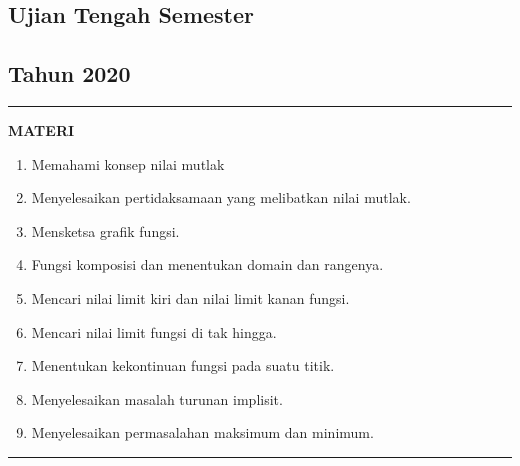 \begin{flushright}
    \section*{\Large{Ujian Tengah Semester}}
    \subsection*{Tahun 2020}
\end{flushright}


\vspace{0.5cm}\hrule height 2pt\vspace{0.5cm}


\begin{center}
\textbf{\large{MATERI}}
\begin{enumerate}[leftmargin=*, label={\arabic*}.]
\item Memahami konsep nilai mutlak
\item Menyelesaikan pertidaksamaan yang melibatkan nilai mutlak.
\item Mensketsa grafik fungsi.
\item Fungsi komposisi dan menentukan domain dan rangenya.
\item Mencari nilai limit kiri dan nilai limit kanan fungsi.
\item Mencari nilai limit fungsi di tak hingga.
\item Menentukan kekontinuan fungsi pada suatu titik.
\item Menyelesaikan masalah turunan implisit.
\item Menyelesaikan permasalahan maksimum dan minimum.
\end{enumerate}
\end{center}


\vspace{0.2cm}\hrule height 1pt\vspace{0.5cm}


